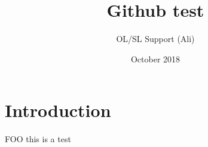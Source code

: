 \documentclass{article}
\title{Github test}
\author{OL/SL Support (Ali) }
\date{October 2018}
\begin{document}
\maketitle

\section{Introduction}

FOO this is a test
\end{document}
